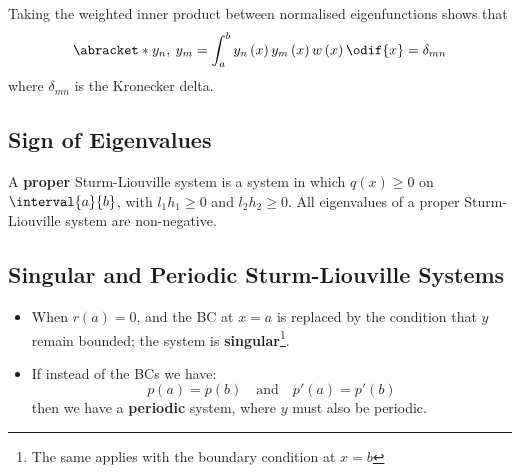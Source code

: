 \documentclass{article}
\begin{document}
Taking the weighted inner product between normalised eigenfunctions shows that
\begin{equation*}
    \abracket*{y_n,\: y_m} = \int_a^b y_n\left( x \right) y_m\left( x \right) w\left( x \right) \odif{x} = \delta_{mn}
\end{equation*}
where \(\delta_{mn}\) is the Kronecker delta.
\subsection{Sign of Eigenvalues}
A \textbf{proper} Sturm-Liouville system is a system in which \(q\left( x \right) \geqslant 0\) on \(\interval{a}{b}\),
with \(l_1h_1 \geqslant 0\) and \(l_2h_2 \geqslant 0\).
All eigenvalues of a proper Sturm-Liouville system are non-negative.
\subsection{Singular and Periodic Sturm-Liouville Systems}
\begin{itemize}
    \item When \(r\left( a \right) = 0\), and the BC at \(x = a\) is replaced by the condition that \(y\) remain bounded; the
          system is \textbf{singular}\footnote{The same applies with the boundary condition at \(x = b\)}.
    \item If instead of the BCs we have:
          \begin{equation*}
              p\left( a \right) = p\left( b \right) \quad \text{and} \quad p'\left( a \right) = p'\left( b \right)
          \end{equation*}
          then we have a \textbf{periodic} system, where \(y\) must also be periodic.
\end{itemize}
\end{document}

